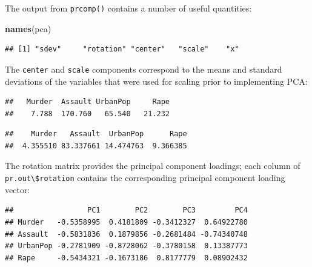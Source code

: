 \documentclass[openany]{book}
\newenvironment{Shaded}{\begin{snugshade}}{\end{snugshade}}
\newcommand{\KeywordTok}[1]{\textcolor[rgb]{0.13,0.29,0.53}{\textbf{#1}}}
\newcommand{\NormalTok}[1]{#1}
\newcommand{\OperatorTok}[1]{\textcolor[rgb]{0.81,0.36,0.00}{\textbf{#1}}}
\begin{document}
The output from \texttt{prcomp()} contains a number of useful quantities:

\begin{Shaded}
\begin{Highlighting}[]
\KeywordTok{names}\NormalTok{(pca)}
\end{Highlighting}
\end{Shaded}

\begin{verbatim}
## [1] "sdev"     "rotation" "center"   "scale"    "x"
\end{verbatim}

The \texttt{center} and \texttt{scale} components correspond to the means and standard
deviations of the variables that were used for scaling prior to implementing
PCA:

\begin{Shaded}
\end{Shaded}

\begin{verbatim}
##   Murder  Assault UrbanPop     Rape 
##    7.788  170.760   65.540   21.232
\end{verbatim}

\begin{Shaded}
\end{Shaded}

\begin{verbatim}
##    Murder   Assault  UrbanPop      Rape 
##  4.355510 83.337661 14.474763  9.366385
\end{verbatim}

The rotation matrix provides the principal component loadings; each column
of \texttt{pr.out\textbackslash{}\$rotation} contains the corresponding principal component
loading vector:

\begin{Shaded}
\end{Shaded}

\begin{verbatim}
##                 PC1        PC2        PC3         PC4
## Murder   -0.5358995  0.4181809 -0.3412327  0.64922780
## Assault  -0.5831836  0.1879856 -0.2681484 -0.74340748
## UrbanPop -0.2781909 -0.8728062 -0.3780158  0.13387773
## Rape     -0.5434321 -0.1673186  0.8177779  0.08902432
\end{verbatim}
\end{document}
